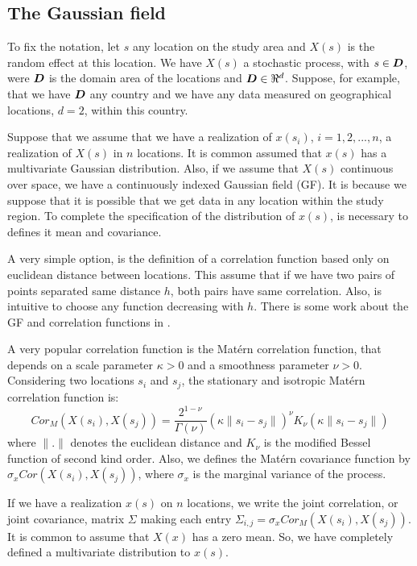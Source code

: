 \subsection{The Gaussian field}

To fix the notation, let $s$ any location on the study 
area and $X(s)$ is the random effect at this location. 
We have $X(s)$ a stochastic process, with $s\in \mbox{\protect \boldmath $D$}$, 
were $\mbox{\protect \boldmath $D$}$ is the domain area of the locations 
and $\mbox{\protect \boldmath $D$}\in \Re^d$. 
Suppose, for example, that we have $\mbox{\protect \boldmath $D$}$ any country 
and we have any data measured on geographical 
locations, $d=2$, within this country. 

Suppose that we assume that we have a realization 
of $x(s_i)$, $i=1,2,...,n$, a realization of $X(s)$ 
in $n$ locations. It is common assumed that 
$x(s)$ has a multivariate Gaussian distribution. 
Also, if we assume that $X(s)$ continuous over space, 
we have a continuously indexed Gaussian field (GF). 
It is because we suppose that it is possible that 
we get data in any location within the study region. 
To complete the specification of the distribution of 
$x(s)$, is necessary to defines it mean and covariance. 

A very simple option, is the definition of a 
correlation function based only on euclidean 
distance between locations. 
This assume that if we have two pairs of 
points separated same distance $h$, both pairs 
have same correlation. 
Also, is intuitive to choose any function 
decreasing with $h$. 
There is some work about the GF and correlation 
functions in \cite{abrahamsen:1997}. 

A very popular correlation function is the 
Mat\'ern correlation function, that depends 
on a scale parameter $\kappa>0$ and a smoothness 
parameter $\nu>0$. 
Considering two locations $s_i$ and $s_j$, the 
stationary and isotropic Mat\'ern correlation function is: 
\begin{equation}
Cor_M(X(s_i), X(s_j)) = 
\frac{2^{1-\nu}}{\Gamma(\nu)}
(\kappa \parallel s_i - s_j\parallel)^\nu 
K_\nu(\kappa \parallel s_i - s_j \parallel)
\end{equation}
where $\parallel . \parallel$ denotes 
the euclidean distance and $K_\nu$ is the modified 
Bessel function of second kind order. 
Also, we defines the Mat\'ern covariance function 
by $\sigma_x Cor(X(s_i), X(s_j))$, where 
$\sigma_x$ is the marginal variance of the process. 

If we have a realization $x(s)$ on $n$ locations, 
we write the joint correlation, or joint covariance, 
matrix $\Sigma$ making each entry 
$\Sigma_{i,j} = \sigma_xCor_M(X(s_i), X(s_j))$. 
It is common to assume that $X(x)$ has a zero mean. 
So, we have completely defined a multivariate 
distribution to $x(s)$. 

